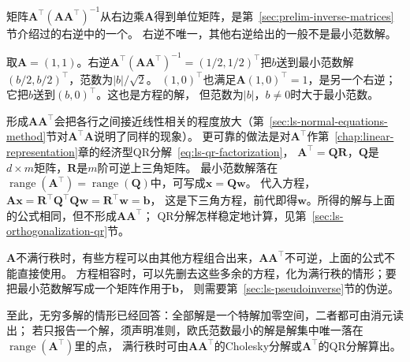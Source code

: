 矩阵$\bm A^\top(\bm A\bm A^\top)^{-1}$从右边乘$\bm A$得到单位矩阵，是第~\ref{sec:prelim-inverse-matrices}节介绍过的右逆中的一个。
右逆不唯一，其他右逆给出的一般不是最小范数解。

\begin{example}[反例：其他右逆不给出最小范数解]
\label{ex:ls-other-right-inverse}
取$\bm A=(1,1)$。右逆$\bm A^\top(\bm A\bm A^\top)^{-1}=(1/2,1/2)^\top$把$b$送到最小范数解$(b/2,b/2)^\top$，范数为$|b|/\sqrt2$。
$(1,0)^\top$也满足$\bm A(1,0)^\top=1$，是另一个右逆；它把$b$送到$(b,0)^\top$。这也是方程的解，
但范数为$|b|$，$b\neq0$时大于最小范数。
\end{example}

形成$\bm A\bm A^\top$会把各行之间接近线性相关的程度放大（第~\ref{sec:ls-normal-equations-method}节对$\bm A^\top\bm A$说明了同样的现象）。
更可靠的做法是对$\bm A^\top$作第~\ref{chap:linear-representation}章的经济型QR分解~\eqref{eq:ls-qr-factorization}，
$\bm A^\top=\bm Q\bm R$，$\bm Q$是$d\times m$矩阵，$\bm R$是$m$阶可逆上三角矩阵。
最小范数解落在$\operatorname{range}(\bm A^\top)=\operatorname{range}(\bm Q)$中，可写成$\bm x=\bm Q\bm w$。
代入方程，$\bm A\bm x=\bm R^\top\bm Q^\top\bm Q\bm w=\bm R^\top\bm w=\bm b$，
这是下三角方程，前代即得$\bm w$。所得的解与上面的公式相同，但不形成$\bm A\bm A^\top$；
QR分解怎样稳定地计算，见第~\ref{sec:ls-orthogonalization-qr}节。

$\bm A$不满行秩时，有些方程可以由其他方程组合出来，$\bm A\bm A^\top$不可逆，上面的公式不能直接使用。
方程相容时，可以先删去这些多余的方程，化为满行秩的情形；要把最小范数解写成一个矩阵作用于$\bm b$，
则需要第~\ref{sec:ls-pseudoinverse}节的伪逆。

至此，无穷多解的情形已经回答：全部解是一个特解加零空间，二者都可由消元读出；
若只报告一个解，须声明准则，欧氏范数最小的解是解集中唯一落在$\operatorname{range}(\bm A^\top)$里的点，
满行秩时可由$\bm A\bm A^\top$的Cholesky分解或$\bm A^\top$的QR分解算出。
